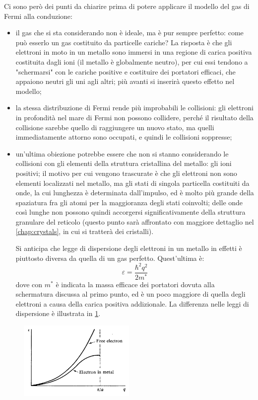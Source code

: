 Ci sono però dei punti da chiarire prima di potere applicare il modello del gas di Fermi alla conduzione:
\begin{itemize}
	\item il gas che si sta considerando non è ideale, ma è pur sempre perfetto: come può esserlo un gas costituito da particelle cariche? La risposta è che gli elettroni in moto in un metallo sono immersi in una regione di carica positiva costituita dagli ioni (il metallo è globalmente neutro), per cui essi tendono a "schermarsi" con le cariche positive e costituire dei portatori efficaci, che appaiono neutri gli uni agli altri; più avanti si inserirà questo effetto nel modello;
	\item la stessa distribuzione di Fermi rende più improbabili le collisioni: gli elettroni in profondità nel mare di Fermi non possono collidere, perché il risultato della collisione sarebbe quello di raggiungere un nuovo stato, ma quelli immediatamente attorno sono occupati, e quindi le collisioni soppresse;
	\item un'ultima obiezione potrebbe essere che non si stanno considerando le collisioni con gli elementi della struttura cristallina del metallo: gli ioni positivi; il motivo per cui vengono trascurate è che gli elettroni non sono elementi localizzati nel metallo, ma gli stati di singola particella costituiti da onde, la cui lunghezza è determinata dall'impulso, ed è molto più grande della spaziatura fra gli atomi per la maggioranza degli stati coinvolti; delle onde così lunghe non possono quindi accorgersi significativamente della struttura granulare del reticolo (questo punto sarà affrontato con maggiore dettaglio nel \cref{chap:crystals}, in cui si tratterà dei cristalli).
	
	Si anticipa che legge di dispersione degli elettroni in un metallo in effetti è piuttosto diversa da quella di un gas perfetto. Quest'ultima è:
	\begin{equation*}
	\varepsilon = \frac{\hbar^2 q^2}{2 m^\ast}
	\end{equation*}
	dove con $m^\ast$ è indicata la massa efficace dei portatori dovuta alla schermatura discussa al primo punto, ed è un poco maggiore di quella degli elettroni a causa della carica positiva addizionale.
	La differenza nelle leggi di dispersione è illustrata in \cref{fig:elecdisp}.
\end{itemize}

\begin{figure}[t]
\centering
\includegraphics[width=0.5\textwidth]{Immagini/ElectronsDispersion.png}
\caption{}
\label{fig:elecdisp}
\end{figure}


